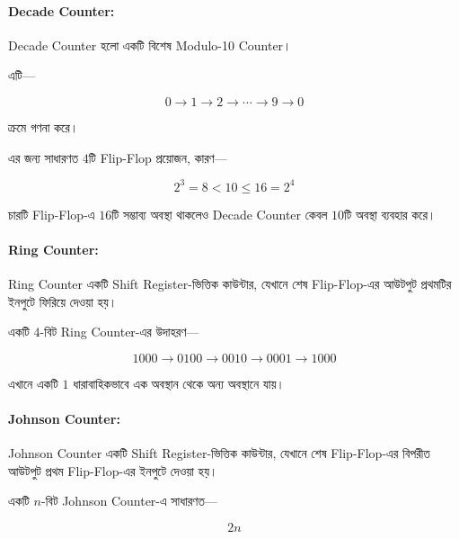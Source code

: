 \paragraph{\textenglish{Decade Counter}:}

\textenglish{Decade Counter} হলো একটি বিশেষ
\textenglish{Modulo-10 Counter}।

এটি—

\[
0\rightarrow1\rightarrow2\rightarrow\cdots
\rightarrow9\rightarrow0
\]

ক্রমে গণনা করে।

এর জন্য সাধারণত \(4\)টি \textenglish{Flip-Flop} প্রয়োজন, কারণ—

\[
2^3=8<10\leq16=2^4
\]

চারটি \textenglish{Flip-Flop}-এ \(16\)টি সম্ভাব্য অবস্থা থাকলেও
\textenglish{Decade Counter} কেবল \(10\)টি অবস্থা ব্যবহার করে।



\paragraph{\textenglish{Ring Counter}:}

\textenglish{Ring Counter} একটি
\textenglish{Shift Register}-ভিত্তিক কাউন্টার,
যেখানে শেষ \textenglish{Flip-Flop}-এর আউটপুট
প্রথমটির ইনপুটে ফিরিয়ে দেওয়া হয়।

একটি \(4\)-বিট \textenglish{Ring Counter}-এর উদাহরণ—

\[
1000\rightarrow0100\rightarrow0010
\rightarrow0001\rightarrow1000
\]

এখানে একটি \(1\) ধারাবাহিকভাবে এক অবস্থান থেকে অন্য অবস্থানে যায়।



\paragraph{\textenglish{Johnson Counter}:}

\textenglish{Johnson Counter} একটি
\textenglish{Shift Register}-ভিত্তিক কাউন্টার,
যেখানে শেষ \textenglish{Flip-Flop}-এর বিপরীত আউটপুট
প্রথম \textenglish{Flip-Flop}-এর ইনপুটে দেওয়া হয়।

একটি \(n\)-বিট \textenglish{Johnson Counter}-এ সাধারণত—

\[
\boxed{
2n
}
\]

